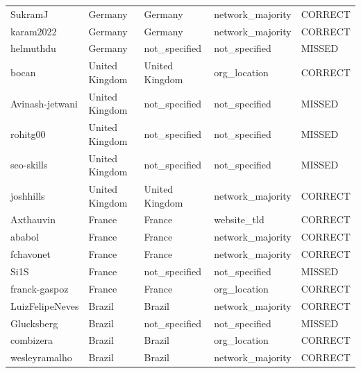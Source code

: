 \documentclass[11pt,a4paper]{article}
\begin{document}
\begin{longtable}{>{\ttfamily\small}p{4.4cm} p{3.0cm} p{3.0cm} p{2.6cm} p{1.6cm}}
\rowcolor{correct}  SukramJ                   & Germany        & Germany        & network\_majority & CORRECT \\
\rowcolor{correct}  karam2022                 & Germany        & Germany        & network\_majority & CORRECT \\
\rowcolor{missed}   helmuthdu                 & Germany        & not\_specified & not\_specified   & MISSED  \\
\rowcolor{correct}  bocan                     & United Kingdom & United Kingdom & org\_location    & CORRECT \\
\rowcolor{missed}   Avinash-jetwani           & United Kingdom & not\_specified & not\_specified   & MISSED  \\
\rowcolor{missed}   rohitg00                  & United Kingdom & not\_specified & not\_specified   & MISSED  \\
\rowcolor{missed}   seo-skills                & United Kingdom & not\_specified & not\_specified   & MISSED  \\
\rowcolor{correct}  joshhills                 & United Kingdom & United Kingdom & network\_majority & CORRECT \\
\rowcolor{correct}  Axthauvin                 & France         & France         & website\_tld     & CORRECT \\
\rowcolor{correct}  ababol                    & France         & France         & network\_majority & CORRECT \\
\rowcolor{correct}  fchavonet                 & France         & France         & network\_majority & CORRECT \\
\rowcolor{missed}   Si1S                      & France         & not\_specified & not\_specified   & MISSED  \\
\rowcolor{correct}  franck-gaspoz             & France         & France         & org\_location    & CORRECT \\
\rowcolor{correct}  LuizFelipeNeves           & Brazil         & Brazil         & network\_majority & CORRECT \\
\rowcolor{missed}   Glucksberg                & Brazil         & not\_specified & not\_specified   & MISSED  \\
\rowcolor{correct}  combizera                 & Brazil         & Brazil         & org\_location    & CORRECT \\
\rowcolor{correct}  wesleyramalho             & Brazil         & Brazil         & network\_majority & CORRECT \\

\end{longtable}
\end{document}
